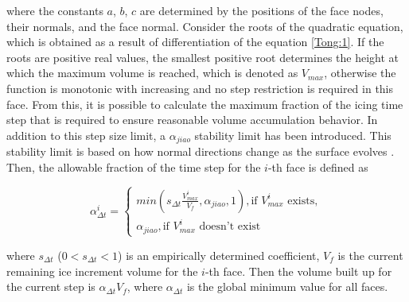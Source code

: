 \documentclass[
11pt,%
tightenlines,%
twoside,%
onecolumn,%
nofloats,%
nobibnotes,%
nofootinbib,%
superscriptaddress,%
noshowpacs,%
centertags]%
{revtex4-2}
\begin{document}
where the constants $a$, $b$, $c$ are determined by the positions of the face nodes, their normals, and the face normal.
Consider the roots of the quadratic equation, which is obtained as a result of differentiation of the equation \ref{Tong:1}.
If the roots are positive real values, the smallest positive root determines the height at which the maximum volume is reached, which is denoted as $V_{max}$, otherwise the function is monotonic with increasing and no step restriction is required in this face.
From this, it is possible to calculate the maximum fraction of the icing time step that is required to ensure reasonable volume accumulation behavior.
In addition to this step size limit, a $\alpha_{jiao}$ stability limit has been introduced.
This stability limit is based on how normal directions change as the surface evolves \cite{Jiao}.
Then, the allowable fraction of the time step for the $i$-th face is defined as

\begin{equation}\label{Tong:2}
\alpha_{\Delta t}^i=
\begin{cases}
min(s_{\Delta t}\frac{V_{max}^i}{V_f},\alpha_{jiao},1), \text{if $V_{max}^i$ exists}, \\
\alpha_{jiao}, \text{if $V_{max}^i$ doesn't exist}
\end{cases}
\end{equation}

where $s_{\Delta t}$ ($0 < s_{\Delta t} < 1$) is an empirically determined coefficient, $V_f$ is the current remaining ice increment volume for the $i$-th face.
Then the volume built up for the current step is $\alpha_{\Delta t} V_f$, where $\alpha_{\Delta t}$ is the global minimum value for all faces.
\end{document}
